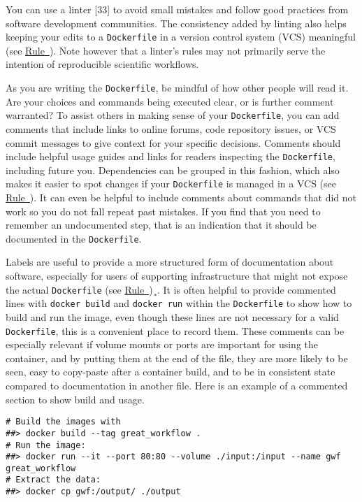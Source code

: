 \documentclass[10pt,letterpaper]{article}
\begin{document}
You can use a linter {[}33{]} to avoid small mistakes and follow good
practices from software development communities. The consistency added
by linting also helps keeping your edits to a \texttt{Dockerfile} in a
version control system (VCS) meaningful (see
\hyperref[{rule:publish}]{Rule~}). Note however
that a linter's rules may not primarily serve the intention of
reproducible scientific workflows.

As you are writing the \texttt{Dockerfile}, be mindful of how other
people will read it. Are your choices and commands being executed clear,
or is further comment warranted? To assist others in making sense of
your \texttt{Dockerfile}, you can add comments that include links to
online forums, code repository issues, or VCS commit messages to give
context for your specific decisions. Comments should include helpful
usage guides and links for readers inspecting the \texttt{Dockerfile},
including future you. Dependencies can be grouped in this fashion, which
also makes it easier to spot changes if your \texttt{Dockerfile} is
managed in a VCS (see
\hyperref[{rule:publish}]{Rule~}). It can even
be helpful to include comments about commands that did not work so you
do not fall repeat past mistakes. If you find that you need to remember
an undocumented step, that is an indication that it should be documented
in the \texttt{Dockerfile}.

Labels are useful to provide a more structured form of documentation
about software, especially for users of supporting infrastructure that
might not expose the actual \texttt{Dockerfile} (see
\hyperref[{rule:metadata}]{Rule~})¸. It is
often helpful to provide commented lines with \texttt{docker\ build} and
\texttt{docker\ run} within the \texttt{Dockerfile} to show how to build
and run the image, even though these lines are not necessary for a valid
\texttt{Dockerfile}, this is a convenient place to record them. These
comments can be especially relevant if volume mounts or ports are
important for using the container, and by putting them at the end of the
file, they are more likely to be seen, easy to copy-paste after a
container build, and to be in consistent state compared to documentation
in another file. Here is an example of a commented section to show build
and usage.

\begin{verbatim}
# Build the images with
##> docker build --tag great_workflow .
# Run the image:
##> docker run --it --port 80:80 --volume ./input:/input --name gwf great_workflow
# Extract the data:
##> docker cp gwf:/output/ ./output
\end{verbatim}
\end{document}
